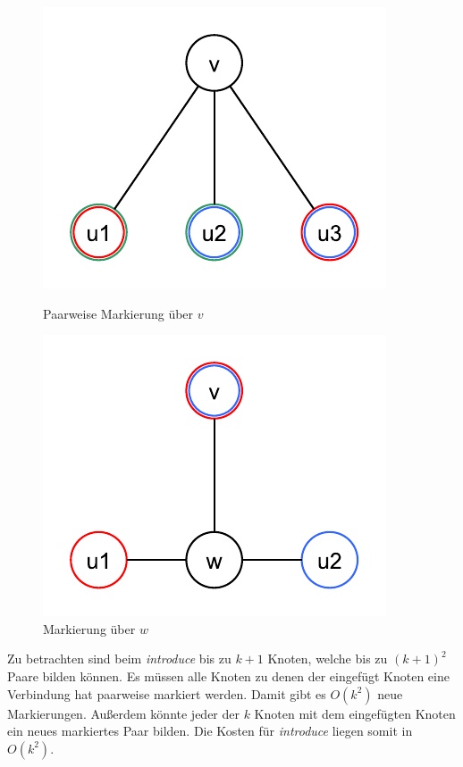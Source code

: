 \begin{itemize}
\begin{figure}[h]
	\center
	\begin{minipage}{0.45\linewidth}
		\center
		\includegraphics[scale=0.4]{fig/03-1b-markierung1}
		\caption{Paarweise Markierung über $v$}
		\label{03-1b-markierung1}	
	\end{minipage}	    
    \begin{minipage}{0.45\linewidth}
    	\center
		\includegraphics[scale=0.4]{fig/03-1b-markierung2}
		\caption{Markierung über $w$}
		\label{03-1b-markeirung2}	
	\end{minipage}	    
\end{figure}

Zu betrachten sind beim \textit{introduce} bis zu $k+1$ Knoten, welche bis zu $(k+1)^2$ Paare bilden können. Es müssen alle Knoten zu denen der eingefügt Knoten eine Verbindung hat paarweise markiert werden. Damit gibt es $O(k^2)$ neue Markierungen. Außerdem könnte jeder der $k$ Knoten mit dem eingefügten Knoten ein neues markiertes Paar bilden. Die Kosten für \textit{introduce} liegen somit in $O(k^2)$.


\end{itemize}
